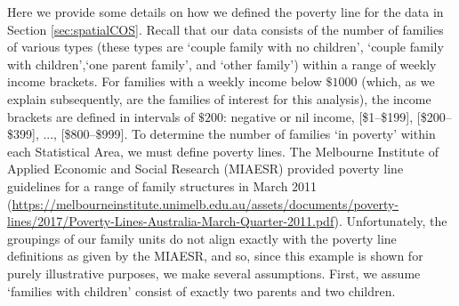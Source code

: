 \documentclass[nojss]{jss}
\begin{document}
\begin{appendix}
Here we provide some details on how we defined the poverty line for the data in Section \ref{sec:spatialCOS}. 
 Recall that our data consists of the number of families of various types (these types are `couple family with no children', `couple family with children',`one parent family', and `other family') within a range of weekly income brackets. 
For families with a weekly income below $\$1000$ (which, as we explain subsequently, are the families of interest for this analysis), the income brackets are defined in intervals of $\$200$: negative or nil income, 
[\$1--\$199], [\$200--\$399], ..., [\$800--\$999]. 
To determine the number of families `in poverty' within each Statistical Area, we must define poverty lines. 
The Melbourne Institute of Applied Economic and Social Research (MIAESR) provided poverty line guidelines for a range of family structures in March 2011 (\url{https://melbourneinstitute.unimelb.edu.au/assets/documents/poverty-lines/2017/Poverty-Lines-Australia-March-Quarter-2011.pdf}).
Unfortunately, the groupings of our family units do not align exactly with the poverty line definitions as given by the MIAESR, and so, since this example is shown for purely illustrative purposes, we make several assumptions. 
First, we assume `families with children' consist of exactly two parents and two children.

\end{appendix}
\end{document}
